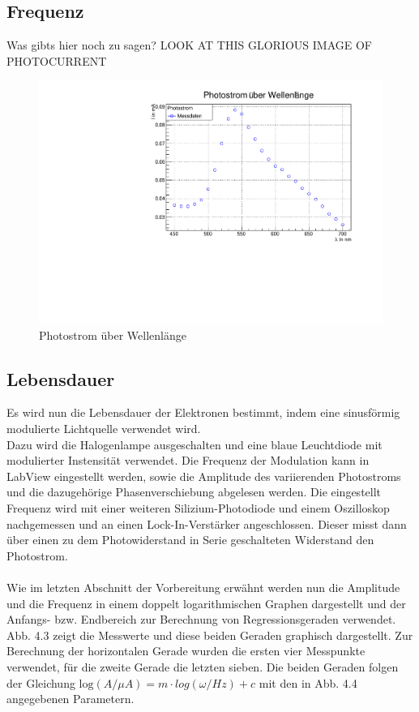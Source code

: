 \subsection{Frequenz}
Was gibts hier noch zu sagen?
LOOK AT THIS GLORIOUS IMAGE OF PHOTOCURRENT
\begin{figure}
\label{A3}
\centering
\includegraphics[scale=0.5]{../A3/A3.pdf}
\caption{Photostrom über Wellenlänge}
\end{figure}


\subsection{Lebensdauer}

Es wird nun die Lebensdauer der Elektronen bestimmt, indem eine sinusförmig modulierte Lichtquelle verwendet wird. \\
Dazu wird die Halogenlampe ausgeschalten und eine blaue Leuchtdiode mit modulierter Instensität verwendet. Die Frequenz der Modulation kann in LabView eingestellt werden, sowie die Amplitude des variierenden Photostroms und die dazugehörige Phasenverschiebung abgelesen werden. Die eingestellt Frequenz wird mit einer weiteren Silizium-Photodiode und einem Oszilloskop nachgemessen und an einen Lock-In-Verstärker angeschlossen. Dieser misst dann über einen zu dem Photowiderstand in Serie geschalteten Widerstand den Photostrom. \\
\\
Wie im letzten Abschnitt der Vorbereitung erwähnt werden nun die Amplitude und die Frequenz in einem doppelt logarithmischen Graphen dargestellt und der Anfangs- bzw. Endbereich zur Berechnung von Regressionsgeraden verwendet. \\
Abb. 4.3 zeigt die Messwerte und diese beiden Geraden graphisch dargestellt. Zur Berechnung der horizontalen Gerade wurden die ersten vier Messpunkte verwendet, für die zweite Gerade die letzten sieben. 
Die beiden Geraden folgen der Gleichung $\mathrm{log} (A / \mu A) = m \cdot log(\omega / Hz) + c$ mit den in Abb. 4.4 angegebenen Parametern. \\

